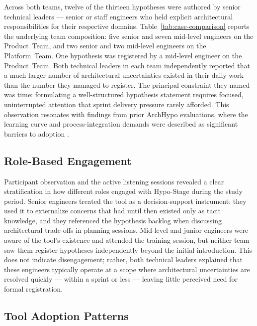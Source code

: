 Across both teams, twelve of the thirteen hypotheses were authored by senior
technical leaders — senior or staff engineers who held explicit architectural
responsibilities for their respective domains. Table~\ref{tab:case-comparison}
reports the underlying team composition: five senior and seven mid-level
engineers on the Product~Team, and two senior and two mid-level engineers on
the Platform~Team. One hypothesis was registered by a mid-level engineer on the
Product~Team. Both technical leaders in each team
independently reported that a much larger number of architectural uncertainties
existed in their daily work than the number they managed to register. The
principal constraint they named was time: formulating a well-structured hypothesis
statement requires focused, uninterrupted attention that sprint delivery
pressure rarely afforded. This observation resonates with findings from prior
ArchHypo evaluations, where the learning curve and process-integration demands
were described as significant barriers to adoption
\citep{silva2024tse, silva2024ieeesw}.

\subsection{Role-Based Engagement}
\label{subsec:role-engagement}

Participant observation and the active listening sessions revealed a clear
stratification in how different roles engaged with Hypo-Stage during the study
period. Senior engineers treated the tool as a decision-support instrument:
they used it to externalize concerns that had until then existed only as tacit
knowledge, and they referenced the hypothesis backlog when discussing
architectural trade-offs in planning sessions. Mid-level and junior engineers
were aware of the tool's existence and attended the training session, but
neither team saw them register hypotheses independently beyond the initial
introduction. This does not indicate disengagement; rather, both technical
leaders explained that these engineers typically operate at a scope where
architectural uncertainties are resolved quickly — within a sprint or less —
leaving little perceived need for formal registration.

\subsection{Tool Adoption Patterns}
\label{subsec:adoption-patterns}


